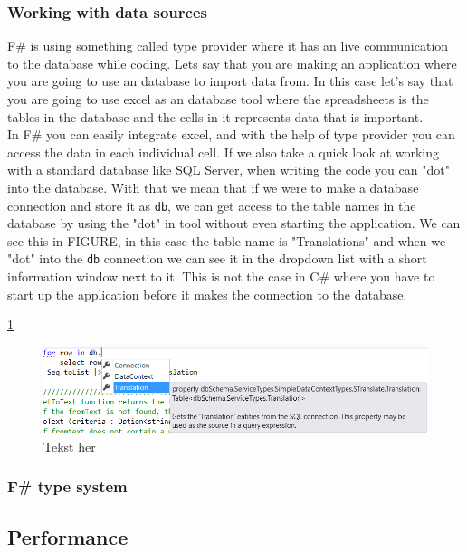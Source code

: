 \documentclass[12pt, a4paper]{article}
\newcommand{\code}[1]{{\small \texttt{#1}}}
\begin{document}
\newpage
\subsubsection{Working with data sources}

F\# is using something called type provider where it has an live communication to the database while coding. Lets say that you are making an application where you are going to use an database to import data from. In this case let's say that you are going to use excel as an database tool where the spreadsheets is the tables in the database and the cells in it represents data that is important. \\

In F\# you can easily integrate excel, and with the help of type provider you can access the data in each individual cell. If we also take a quick look at working with a standard database like SQL Server, when writing the code you can "dot" into the database. With that we mean that if we were to make a database connection and store it as \code{db}, we can get access to the table names in the database by using the "dot" in tool without even starting the application. We can see this in FIGURE, in this case the table name is "Translations" and when we "dot" into the \code{db} connection we can see it in the dropdown list with a short information window next to it. This is not the case in C\# where you have to start up the application before it makes the connection to the database.

\ref{fig:nameOfFigure}

\begin{figure}[!h]
    \includegraphics[width=\textwidth]{visualstudio1}
    \centering
    \caption{Tekst her}
    \label{fig:nameOfFigure}
\end{figure}

\subsubsection{F\# type system}



\newpage
\subsection{Performance}
\end{document}

